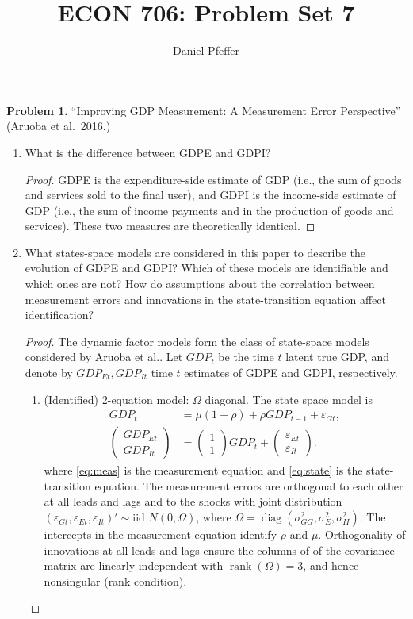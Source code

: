 \documentclass[oneside,reqno]{amsart}
\title{ECON 706: Problem Set 7}
\author{Daniel Pfeffer}
\DeclareMathOperator{\diag}{diag}
\DeclareMathOperator{\rank}{rank}
\newcommand{\eps}{\varepsilon}
\theoremstyle{definition}
\newtheorem{prob}{Problem}
\begin{document}
\maketitle

\begin{prob}
``Improving GDP Measurement: A Measurement Error Perspective'' (Aruoba et al.\ 2016.)
\end{prob}

\begin{enumerate}[label=(\roman*)]
\item
What is the difference between GDPE and GDPI?
\begin{proof}
GDPE is the expenditure-side estimate of GDP  (i.e., the sum of goods and services sold to the final user), and GDPI is the income-side estimate of GDP (i.e., the sum of income payments and  in the production of goods and services). These two measures are theoretically identical.
\end{proof}
\item
What states-space models are considered in this paper to describe the
evolution of GDPE and GDPI? Which of these models are identifiable and which ones are not? How do assumptions about the correlation between measurement errors and innovations in the state-transition equation affect identification?
\begin{proof}
The dynamic factor models form the class of state-space models considered by Aruoba et al.. Let $GDP_t$ be the time $t$ latent true GDP, and denote by $GDP_{Et}, GDP_{It}$ time $t$ estimates of GDPE and GDPI, respectively.  
\leavevmode
\begin{enumerate}[label=(\arabic*)]
\item
(Identified) 2-equation model: $\Omega$ diagonal. The state space model is 
\begin{align}
	GDP_t &= \mu(1-\rho) + \rho GDP_{t-1} + \eps_{Gt}, \label{eq:state} \\
	\begin{pmatrix}
		GDP_{Et}  \\ GDP_{It}
	\end{pmatrix} 
	&= \begin{pmatrix}
		1 \\ 1
	\end{pmatrix} GDP_t
	+ \begin{pmatrix}
		\eps_{Et} \\ \eps_{It}
	\end{pmatrix}  \label{eq:meas}.
\end{align}
where \eqref{eq:meas} is the measurement equation and \eqref{eq:state} is the state-transition equation. The measurement errors are orthogonal to each other at all leads and lags and to the shocks with joint distribution $(\eps_{Gt}, \eps_{Et}, \eps_{It})' \sim \text{iid } N(0, \Omega)$, where $\Omega = \diag(\sigma_{GG}^2, \sigma_E^2, \sigma_{II}^2)$. The intercepts in the measurement equation identify $\rho$ and $\mu$. Orthogonality of innovations at all leads and lags ensure the columns of of the covariance matrix are linearly independent with $\rank(\Omega) = 3$, and hence nonsingular (rank condition).

\end{enumerate}
\end{proof}
\end{enumerate}
\end{document}
